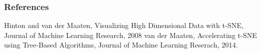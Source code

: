 \documentclass{beamer}
\begin{document}
 \begin{frame}
   \frametitle{References}

   Hinton and van der Maaten, Visualizing High Dimensional Data with t-SNE, Journal of Machine Learning Research, 2008
   \bigskip\noindent
   van der Maaten, Accelerating t-SNE using Tree-Based Algorithms, Journal of Machine Learning Reserach, 2014.
 \end{frame}
 
  
\end{document}
